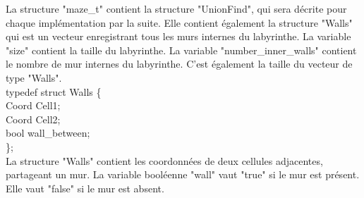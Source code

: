 \documentclass[11pt]{article}
\begin{document}
La structure "maze\_t" contient la structure "UnionFind", qui sera décrite pour chaque implémentation par la suite. Elle contient également la structure "Walls" qui est un vecteur enregistrant tous les murs internes du labyrinthe. La variable "size" contient la taille du labyrinthe. La variable "number\_inner\_walls" contient le nombre de mur internes du labyrinthe. C'est également la taille du vecteur de type "Walls". \\
\linebreak
typedef struct Walls \{ \\
    Coord Cell1; \\
    Coord Cell2; \\
    bool wall\_between; \\
\};\\

La structure "Walls" contient les coordonnées de deux cellules adjacentes, partageant un mur. La variable booléenne "wall" vaut "true" si le mur est présent. Elle vaut "false" si le mur est absent.\\
\end{document}
